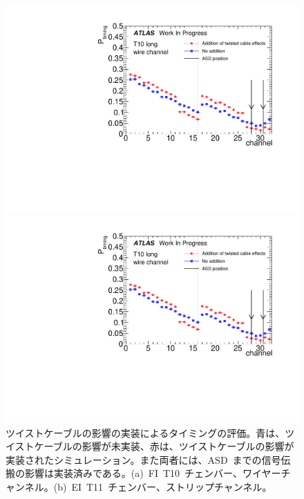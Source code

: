 \begin{figure}[H]
    \begin{minipage}{0.49\hsize}
    \centering   
    \includegraphics[width=\textwidth,page=1]{img/plot/twist.pdf}
    \subcaption{}
    \end{minipage}
    \begin{minipage}{0.49\hsize}
    \centering   
    \includegraphics[width=\textwidth,page=2]{img/plot/twist.pdf}
    \subcaption{}
    \end{minipage}
    \caption[ツイストケーブルの影響の実装によるタイミングの評価]{ツイストケーブルの影響の実装によるタイミングの評価。青は、ツイストケーブルの影響が未実装、赤は、ツイストケーブルの影響が実装されたシミュレーション。また両者には、ASD~までの信号伝搬の影響は実装済みである。(a)~FI~T10~チェンバー、ワイヤーチャンネル。(b)~EI~T11~チェンバー、ストリップチャンネル。}
    \label{fig:twist}
\end{figure}

